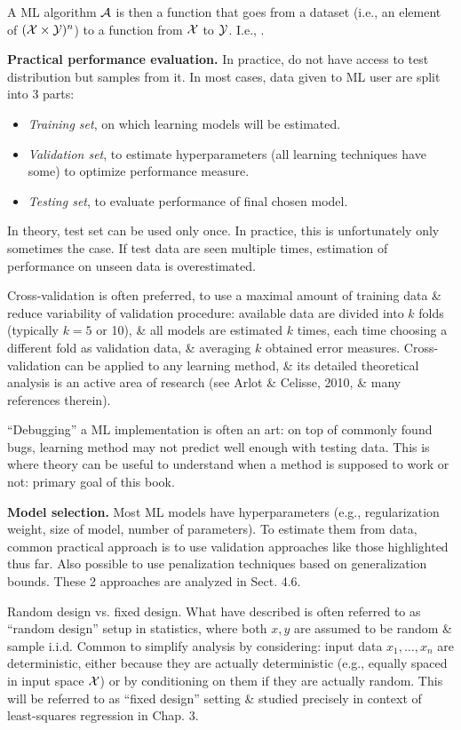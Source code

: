 \documentclass{article}
\begin{document}
\begin{enumerate}
\begin{itemize}
\begin{itemize}
			A ML algorithm ${\cal A}$ is then a function that goes from a dataset (i.e., an element of $({\cal X}\times{\cal Y})^n$) to a function from ${\cal X}$ to ${\cal Y}$. I.e., .
			
			{\bf Practical performance evaluation.} In practice, do not have access to test distribution but samples from it. In most cases, data given to ML user are split into 3 parts:
			\begin{itemize}
				\item {\it Training set}, on which learning models will be estimated.
				\item {\it Validation set}, to estimate hyperparameters (all learning techniques have some) to optimize performance measure.
				\item {\it Testing set}, to evaluate performance of final chosen model.
			\end{itemize}
			In theory, test set can be used only once. In practice, this is unfortunately only sometimes the case. If test data are seen multiple times, estimation of performance on unseen data is overestimated.
			
			Cross-validation is often preferred, to use a maximal amount of training data \& reduce variability of validation procedure: available data are divided into $k$ folds (typically $k = 5$ or 10), \& all models are estimated $k$ times, each time choosing a different fold as validation data, \& averaging $k$ obtained error measures. Cross-validation can be applied to any learning method, \& its detailed theoretical analysis is an active area of research (see Arlot \& Celisse, 2010, \& many references therein).
			
			``Debugging'' a ML implementation is often an art: on top of commonly found bugs, learning method may not predict well enough with testing data. This is where theory can be useful to understand when a method is supposed to work or not: primary goal of this book.
			
			{\bf Model selection.} Most ML models have hyperparameters (e.g., regularization weight, size of model, number of parameters). To estimate them from data, common practical approach is to use validation approaches like those highlighted thus far. Also possible to use penalization techniques based on generalization bounds. These 2 approaches are analyzed in Sect. 4.6.
			
			{\sf Random design vs. fixed design.} What have described is often referred to as ``random design'' setup in statistics, where both $x,y$ are assumed to be random \& sample i.i.d. Common to simplify analysis by considering: input data $x_1,\ldots,x_n$ are deterministic, either because they are actually deterministic (e.g., equally spaced in input space ${\cal X}$) or by conditioning on them if they are actually random. This will be referred to as ``fixed design'' setting \& studied precisely in context of least-squares regression in Chap. 3.
			

\end{itemize}
\end{itemize}
\end{enumerate}
\end{document}
